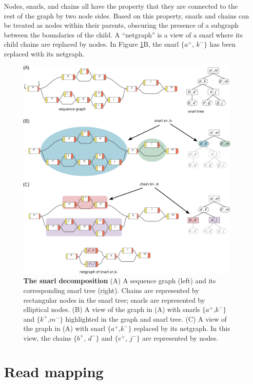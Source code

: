 \documentclass[11pt]{ucscthesis}
\begin{document}
Nodes, snarls, and chains all have the property that they are connected to the rest of the graph by two node sides.
Based on this property, snarls and chains can be treated as nodes within their parents, obscuring the presence of a subgraph between the boundaries of the child.
A ``netgraph'' is a view of a snarl where its child chains are replaced by nodes.
In Figure \ref{fig:snarl_tree}B, the snarl $\{a^+$, $k^-\}$ has been replaced with its netgraph.

\begin{figure}[htp]
    \centering
    \includegraphics[width=\columnwidth]{snarl_tree.pdf}
    \caption[Snarl decomposition]{\textbf{The snarl decomposition} (A) A sequence graph (left) and its corresponding snarl tree (right). Chains are represented by rectangular nodes in the snarl tree; snarls are represented by elliptical nodes.
    (B) A view of the graph in (A) with snarls $\{a^+$,$k^-\}$ and $\{k^+$,$m^-\}$ highlighted in the graph and snarl tree. (C) A view of the graph in (A) with snarl $\{a^+$,$k^-\}$ replaced by its netgraph. In this view, the chains $\{b^+$, $d^-\}$ and $\{e^+$, $j^-\}$ are represented by nodes.}
    \label{fig:snarl_tree}
\end{figure}

\section{Read mapping}
\label{sec:background:mapping}
\end{document}
